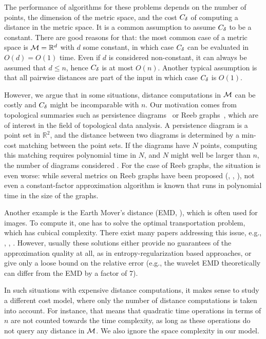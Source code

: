 \documentclass{ws-ijcga}
\renewcommand{\leq}{\leqslant}
\newcommand{\RR}{\mathbb{R}}
\begin{document}
The performance of algorithms for these problems depends on the number of points,
the dimension of the metric space, and the cost $C_{\delta}$ of computing a distance in the metric space.
It is a common assumption to assume $C_{\delta}$ to be a constant.
There are good reasons for that: the most common case of a metric space
is $\metricspace=\RR^d$ with $d$ some constant, in which case $C_{\delta}$ can be evaluated in $O(d)=O(1)$ time.
Even if $d$ is considered non-constant,
it can always be assumed that $d\leq n$, hence $C_{\delta}$ is at most $O(n)$.
Another typical assumption is that all pairwise distances are part of the input
in which case $C_{\delta}$ is $O(1)$.

However, we argue that in some situations, distance computations
in $\mathcal{M}$ can be costly and $C_{\delta}$ might be incomparable
with $n$. Our motivation comes from topological summaries
such as persistence diagrams~\cite{elz-topological} or Reeb graphs~\cite{reeb-survey}, which are of interest
in the field of topological data analysis. A persistence diagram
is a point set in $\RR^2$, and the distance between two diagrams
is determined by a min-cost matching between the point sets.
If the diagrams have $N$ points, computing this matching requires
polynomial time in $N$, and $N$ might well be larger than $n$, the number
of diagrams considered \cite{cohen2007stability}. For the case of Reeb graphs, the situation is even
worse: while several metrics on Reeb graphs have been proposed (\cite{bauer2014measuring}, \cite{de2016categorified},
\cite{di2016edit}),
not even a constant-factor approximation algorithm is known that runs
in polynomial time in the size of the graphs.


Another example is the Earth Mover's distance (EMD, \cite{rubner2000earth}), which
is often used for images.
To compute it, one has to solve the optimal
transportation problem, which has cubical complexity. There exist many papers addressing this issue,
e.g., \cite{wemd}, \cite{grounded_emd}, \cite{entropy_emd}.
However, usually these solutions either provide no guarantees of the approximation
quality at all, as in entropy-regularization based approaches,
or give only a loose bound on the relative error (e.g., the wavelet EMD \cite{wemd}
theoretically can differ from the EMD by a factor of 7).



In such situations with expensive distance computations,
it makes sense to study a different cost model, where only the number of distance computations
is taken into account. For instance, that means that quadratic time operations in terms of $n$
are not counted towards the time complexity, as long as these operations do not query any distance
in $\mathcal{M}$. We also ignore the space complexity in our model.
\end{document}
